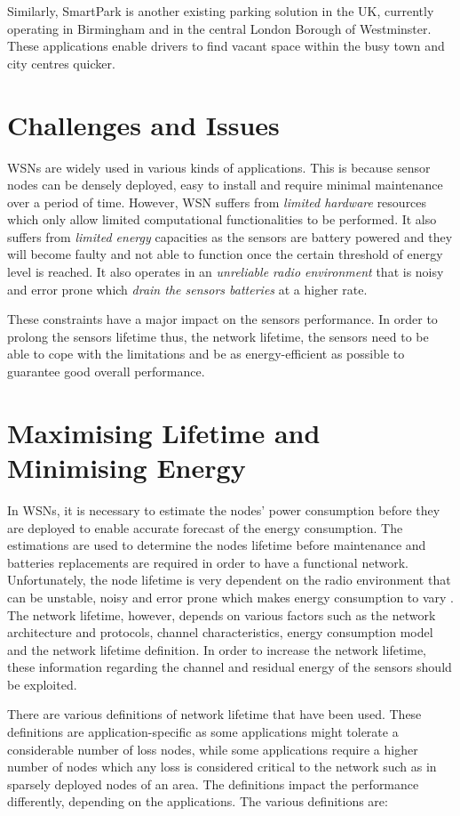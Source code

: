 Similarly, SmartPark is another existing parking solution in the UK, currently operating in Birmingham and in the central London Borough of Westminster. These applications enable drivers to find vacant space within the busy town and city centres quicker.

\section{Challenges and Issues}
WSNs are widely used in various kinds of applications. This is because sensor nodes can be densely deployed, easy to install and require minimal maintenance over a period of time. However, WSN suffers from \textit{limited hardware} resources which only allow limited computational functionalities to be performed. It also suffers from \textit{limited energy} capacities as the sensors are battery powered and they will become faulty and not able to function once the certain threshold of energy level is reached. It also operates in an \textit{unreliable radio environment} that is noisy and error prone which \textit{drain the sensors batteries} at a higher rate.

These constraints have a major impact on the sensors performance. In order to prolong the sensors lifetime thus, the network lifetime, the sensors need to be able to cope with the limitations and be as energy-efficient as possible to guarantee good overall performance.

\section{Maximising Lifetime and Minimising Energy}
In WSNs, it is necessary to estimate the nodes' power consumption before they are deployed to enable accurate forecast of the energy consumption. The estimations are used to determine the nodes lifetime before maintenance and batteries replacements are required in order to have a functional network. Unfortunately, the node lifetime is very dependent on the radio environment that can be unstable, noisy and error prone which makes energy consumption to vary \cite{alexlifetime}. The network lifetime, however, depends on various factors such as the network architecture and protocols, channel characteristics, energy consumption model and the network lifetime definition. In order to increase the network lifetime, these information regarding the channel and residual energy of the sensors should be exploited.

There are various definitions of network lifetime that have been used. These definitions are application-specific as some applications might tolerate a considerable number of loss nodes, while some applications require a higher number of nodes which any loss is considered critical to the network such as in sparsely deployed nodes of an area. The definitions impact the performance differently, depending on the applications. The various definitions are:


